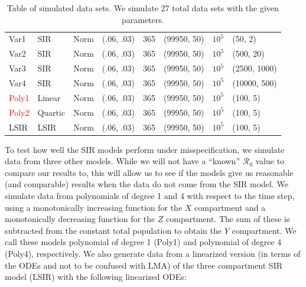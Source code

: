 \documentclass[12pt]{article}
\newcommand{\rr}{\ensuremath{\mathcal{R}_0}}
\begin{document}
\begin{table}[]
\begin{tabular}{@{}llllllll@{}}
 \midrule
  Var1      & SIR      &   Norm             & (.06, .03)                          &     365       &  (99950, 50)                    &  $10^5$          &(50, 2)                                \\
  Var2      & SIR      &   Norm             & (.06, .03)                          &     365       &  (99950, 50)                    &  $10^5$          &(500, 20)                                \\
  Var3      & SIR      &   Norm             & (.06, .03)                          &     365       &  (99950, 50)                    &  $10^5$          &(2500, 1000)                                \\
  Var4      & SIR      &   Norm             & (.06, .03)                          &     365       &  (99950, 50)                    &  $10^5$          &(10000, 500)                                \\ \midrule
  \textcolor{red}{Poly1}     & Linear      &   Norm             & (.06, .03)                          &     365       &  (99950, 50)                    &  $10^5$          &(100, 5)                            \\
  \textcolor{red}{Poly2}    & Quartic      &   Norm             & (.06, .03)                          &     365       &  (99950, 50)                    &  $10^5$          &(100, 5)                            \\ 
   LSIR     & LSIR      &   Norm             & (.06, .03)                          &     365       &  (99950, 50)                    &  $10^5$          &(100, 5)                            \\ 
  \bottomrule
\end{tabular}
\caption{Table of simulated data sets.  We simulate 27 total data sets with the given parameters.}
\label{tab:simulated-data}
\end{table}

To test how well the SIR models perform under misspecification, we simulate data from three other models. While we will not have a ``known'' $\rr$ value to compare our results to, this will allow us to see if the models give us reasonable (and comparable) results when the data do not come from the SIR model. We simulate data from polynomials of degree 1 and 4 with respect to the time step, using a monotonically increasing function for the $X$ compartment and a monotonically decreasing function for the $Z$ compartment.   The sum of these is subtracted from the constant total population to obtain the $Y$ compartment. We call these models polynomial of degree 1 (Poly1) and polynomial of degree 4 (Poly4), respectively. We also generate data from a linearized version (in terms of the ODEs and not to be confused with LMA) of the three compartment SIR model (LSIR) with the following linearized ODEs:
\end{document}
